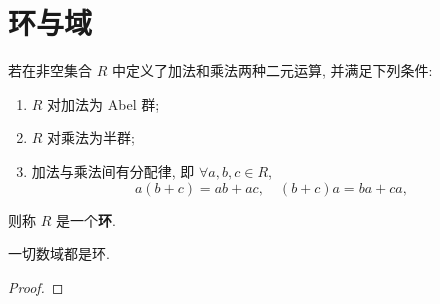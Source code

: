 \documentclass[../../main.tex]{subfiles}
\begin{document}
\section{环与域}

\begin{definition}[环]
若在非空集合 \( R \) 中定义了加法和乘法两种二元运算, 并满足下列条件:
\begin{enumerate}[(1)]
\item \( R \) 对加法为 Abel 群;
\item \( R \) 对乘法为半群;
\item 加法与乘法间有分配律, 即 \( \forall a,b,c \in R \),
\[
a(b + c) = ab + ac, \quad (b + c)a = ba + ca,
\]
\end{enumerate}
则称 \( R \) 是一个\textbf{环}.
\end{definition}

\begin{proposition}
一切数域都是环.
\end{proposition}
\begin{proof}


\end{proof}
\end{document}

